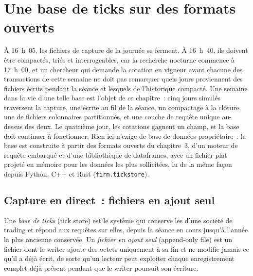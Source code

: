 \chapter{Une base de ticks sur des formats ouverts}\label{ch:pl:a-tick-store-on-open-formats}

À 16~h~05, les fichiers de capture de la journée se ferment. À 16~h~40, ils doivent être compactés, triés et interrogeables, car la recherche nocturne
commence à 17~h~00, et un chercheur qui demande la cotation en vigueur avant chacune des transactions de cette semaine ne doit pas remarquer
quels jours proviennent des fichiers écrits pendant la séance et lesquels de l'historique compacté. Une semaine dans la vie d'une telle base
est l'objet de ce chapitre~: cinq jours simulés traversent la capture, une  écrite au fil de la séance, un compactage à la
clôture, une  de fichiers colonnaires partitionnés, et une couche de requête unique au-dessus des deux. Le quatrième jour, les cotations gagnent un
champ, et la base doit continuer à fonctionner. Rien ici n'exige de base de données propriétaire~: la base est construite à partir des formats ouverts du
chapitre~3, d'un moteur de requête embarqué et d'une bibliothèque de dataframes, avec un fichier plat projeté en mémoire pour les données les plus sollicitées, lu de la même
façon depuis Python, C++ et Rust (\texttt{firm.tickstore}).

\section{Capture en direct~: fichiers en ajout seul}

\begin{definition}\label{def:pl:a-tick-store-on-open-formats:store}
Une \emph{base de ticks} (tick store) est le système qui conserve les  d'une société de trading et répond aux requêtes sur elles, depuis la séance en cours
jusqu'à l'année la plus ancienne conservée. Un \emph{fichier en ajout seul} (append-only file) est un fichier dont le writer ajoute des octets
uniquement à sa fin et ne modifie jamais ce qu'il a déjà écrit, de sorte qu'un lecteur peut exploiter chaque enregistrement complet déjà présent pendant que le writer
poursuit son écriture.
\end{definition}


